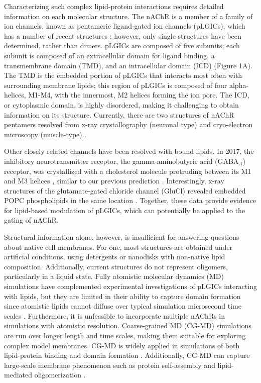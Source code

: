 Characterizing such complex lipid-protein interactions requires detailed information on each molecular structure. The nAChR is a member of a family of ion channels, known as pentameric ligand-gated ion channels (pLGICs), which has a number of recent structures \citep{Laverty2019,Laverty2017,Masiulis2019,Althoff2014,Hibbs2011,Morales2016,Baenziger2011,Corringer2012,S089662731630023X20160504,Prevost2012a,Sauguet2014}; however, only single structures have been determined, rather than dimers. pLGICs are composed of five subunits; each subunit is composed of an extracellular domain for ligand binding, a transmembrane domain (TMD), and an intracellular domain (ICD) (Figure 1A). The TMD is the embedded portion of pLGICs that interacts most often with surrounding membrane lipids; this region of pLGICs is composed of four alpha-helices, M1-M4, with the innermost, M2 helices forming the ion pore. The ICD, or cytoplasmic domain, is highly disordered, making it challenging to obtain information on its structure. Currently, there are two structures of nAChR pentamers resolved from x-ray crystallography (neuronal type) and cryo-electron microscopy (muscle-type) \citep{osti1330893, Unwin2005}.

Other closely related channels have been resolved with bound lipids. In 2017, the inhibitory neurotransmitter receptor, the gamma-aminobutyric acid (GABA$_A$) receptor, was crystallized with a cholesterol molecule protruding between its M1 and M3 helices \citep{Laverty2017}, similar to our previous prediction \citep{Henin2014}. Interestingly, x-ray structures of the glutamate-gated chloride channel (GluCl) revealed embedded POPC phospholipids in the same location \citep{Althoff2014}. Together, these data provide evidence for lipid-based modulation of pLGICs, which can potentially be applied to the gating of nAChR.

Structural information alone, however, is insufficient for answering questions about native cell membranes. For one, most structures are obtained under artificial conditions, using detergents or nanodisks with non-native lipid composition. Additionally, current structures do not represent oligomers, particularly in a liquid state. Fully atomistic molecular dynamics (MD) simulations \citep{brannigan, Cheng2009, Hnin_A_2014, Carswell_Role_2015} have complemented experimental investigations of pLGICs interacting with lipids, but they are limited in their ability to capture domain formation since atomistic lipids cannot diffuse over typical simulation microsecond time scales \citep{Ingolfsson2014,Bond2006,Parton2013,Goose2013,Scott2008}.  Furthermore, it is unfeasible to incorporate multiple nAChRs in simulations with atomistic resolution. Coarse-grained MD (CG-MD) simulations are run over longer length and time scales, making them suitable for exploring complex model membranes. CG-MD is widely applied in simulations of both lipid-protein binding and domain formation \citep{Bond2006,Scott2008,Parton2013,Goose2013}. Additionally, CG-MD can capture large-scale membrane phenomenon such as protein self-assembly and lipid-mediated oligomerization \citep{10.3389/fphys.2016.00494, BAADEN2013878}.

